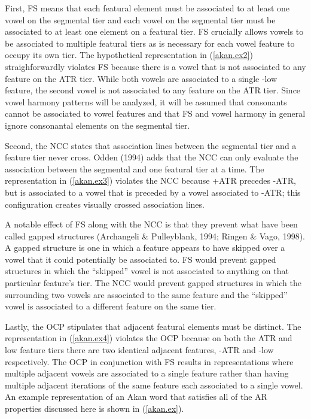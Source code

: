 \documentclass[,doc,floatsintext]{apa6}
\theoremstyle{definition}
\theoremstyle{definition}
\theoremstyle{definition}
\theoremstyle{remark}
\begin{document}
First, FS means that each featural element must be associated to at
least one vowel on the segmental tier and each vowel on the segmental
tier must be associated to at least one element on a featural tier. FS
crucially allows vowels to be associated to multiple featural tiers as
is necessary for each vowel feature to occupy its own tier. The
hypothetical representation in (\ref{akan.ex2}) straighforwardly
violates FS because there is a vowel that is not associated to any
feature on the ATR tier. While both vowels are associated to a single
-low feature, the second vowel is not associated to any feature on the
ATR tier. Since vowel harmony patterns will be analyzed, it will be
assumed that consonants cannot be associated to vowel features and that
FS and vowel harmony in general ignore consonantal elements on the
segmental tier.

Second, the NCC states that association lines between the segmental tier
and a feature tier never cross. Odden (1994) adds that the NCC can only
evaluate the association between the segmental and one featural tier at
a time. The representation in (\ref{akan.ex3}) violates the NCC because
+ATR precedes -ATR, but is associated to a vowel that is preceded by a
vowel associated to -ATR; this configuration creates visually crossed
association lines.

A notable effect of FS along with the NCC is that they prevent what have
been called gapped structures (Archangeli \& Pulleyblank, 1994; Ringen
\& Vago, 1998). A gapped structure is one in which a feature appears to
have skipped over a vowel that it could potentially be associated to. FS
would prevent gapped structures in which the \enquote{skipped} vowel is
not associated to anything on that particular feature's tier. The NCC
would prevent gapped structures in which the surrounding two vowels are
associated to the same feature and the \enquote{skipped} vowel is
associated to a different feature on the same tier.

Lastly, the OCP stipulates that adjacent featural elements must be
distinct. The representation in (\ref{akan.ex4}) violates the OCP
because on both the ATR and low feature tiers there are two identical
adjacent features, -ATR and -low respectively. The OCP in conjunction
with FS results in representations where multiple adjacent vowels are
associated to a single feature rather than having multiple adjacent
iterations of the same feature each associated to a single vowel. An
example representation of an Akan word that satisfies all of the AR
properties discussed here is shown in (\ref{akan.ex}).
\end{document}
